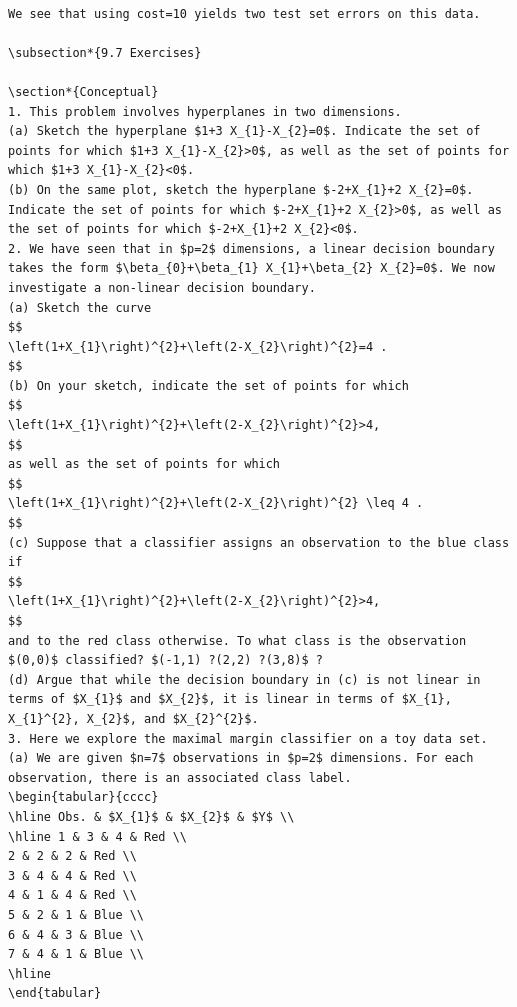 \documentclass[10pt]{article}
\begin{document}
\begin{verbatim}

We see that using cost=10 yields two test set errors on this data.

\subsection*{9.7 Exercises}

\section*{Conceptual}
1. This problem involves hyperplanes in two dimensions.
(a) Sketch the hyperplane $1+3 X_{1}-X_{2}=0$. Indicate the set of points for which $1+3 X_{1}-X_{2}>0$, as well as the set of points for which $1+3 X_{1}-X_{2}<0$.
(b) On the same plot, sketch the hyperplane $-2+X_{1}+2 X_{2}=0$. Indicate the set of points for which $-2+X_{1}+2 X_{2}>0$, as well as the set of points for which $-2+X_{1}+2 X_{2}<0$.
2. We have seen that in $p=2$ dimensions, a linear decision boundary takes the form $\beta_{0}+\beta_{1} X_{1}+\beta_{2} X_{2}=0$. We now investigate a non-linear decision boundary.
(a) Sketch the curve
$$
\left(1+X_{1}\right)^{2}+\left(2-X_{2}\right)^{2}=4 .
$$
(b) On your sketch, indicate the set of points for which
$$
\left(1+X_{1}\right)^{2}+\left(2-X_{2}\right)^{2}>4,
$$
as well as the set of points for which
$$
\left(1+X_{1}\right)^{2}+\left(2-X_{2}\right)^{2} \leq 4 .
$$
(c) Suppose that a classifier assigns an observation to the blue class if
$$
\left(1+X_{1}\right)^{2}+\left(2-X_{2}\right)^{2}>4,
$$
and to the red class otherwise. To what class is the observation $(0,0)$ classified? $(-1,1) ?(2,2) ?(3,8)$ ?
(d) Argue that while the decision boundary in (c) is not linear in terms of $X_{1}$ and $X_{2}$, it is linear in terms of $X_{1}, X_{1}^{2}, X_{2}$, and $X_{2}^{2}$.
3. Here we explore the maximal margin classifier on a toy data set.
(a) We are given $n=7$ observations in $p=2$ dimensions. For each observation, there is an associated class label.
\begin{tabular}{cccc}
\hline Obs. & $X_{1}$ & $X_{2}$ & $Y$ \\
\hline 1 & 3 & 4 & Red \\
2 & 2 & 2 & Red \\
3 & 4 & 4 & Red \\
4 & 1 & 4 & Red \\
5 & 2 & 1 & Blue \\
6 & 4 & 3 & Blue \\
7 & 4 & 1 & Blue \\
\hline
\end{tabular}


\end{verbatim}
\end{document}
